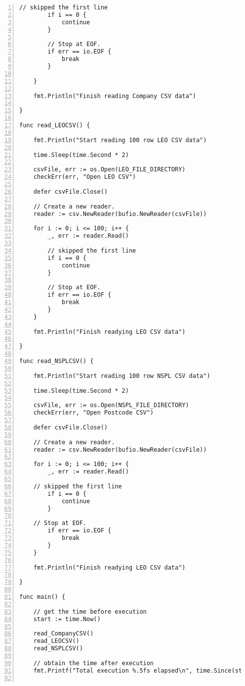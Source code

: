 \begin{lstlisting}[breaklines, frame=single, numbers=left, caption={Golang Sequential Program Source Code}, label=commandline-02]
		// skipped the first line
		if i == 0 {
			continue
		}
		
		// Stop at EOF.
		if err == io.EOF {
			break
		}
	
	}
	
	fmt.Println("Finish reading Company CSV data")

}

func read_LEOCSV() {

	fmt.Println("Start reading 100 row LEO CSV data")
	
	time.Sleep(time.Second * 2)
	
	csvFile, err := os.Open(LEO_FILE_DIRECTORY)
	checkErr(err, "Open LEO CSV")
	
	defer csvFile.Close()
	
	// Create a new reader.
	reader := csv.NewReader(bufio.NewReader(csvFile))
	
	for i := 0; i <= 100; i++ {
		_, err := reader.Read()
		
		// skipped the first line
		if i == 0 {
			continue
		}
		
		// Stop at EOF.
		if err == io.EOF {
			break
		}
	}
	
	fmt.Println("Finish readying LEO CSV data")

}

func read_NSPLCSV() {

	fmt.Println("Start reading 100 row NSPL CSV data")
	
	time.Sleep(time.Second * 2)
	
	csvFile, err := os.Open(NSPL_FILE_DIRECTORY)
	checkErr(err, "Open Postcode CSV")
	
	defer csvFile.Close()
	
	// Create a new reader.
	reader := csv.NewReader(bufio.NewReader(csvFile))
	
	for i := 0; i <= 100; i++ {
		_, err := reader.Read()
	
	// skipped the first line
		if i == 0 {
			continue
		}
	
	// Stop at EOF.
		if err == io.EOF {
			break
		}
	}
	
	fmt.Println("Finish readying LEO CSV data")

}

func main() {

	// get the time before execution
	start := time.Now()
	
	read_CompanyCSV()
	read_LEOCSV()
	read_NSPLCSV()
	
	// obtain the time after execution
	fmt.Printf("Total execution %.5fs elapsed\n", time.Since(start).Seconds())


\end{lstlisting}
